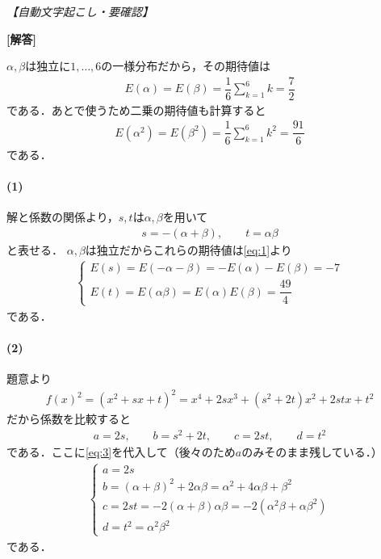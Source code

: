 \documentclass[../../main.tex]{subfiles}
\begin{document}
\begin{oframed}
  
\end{oframed}

\begin{flushright}
  \footnotesize\textit{【自動文字起こし・要確認】}
\end{flushright}

{\bf [解答]}

$\alpha, \beta$は独立に$1,\dots,6$の一様分布だから，その期待値は
\begin{align}
  E(\alpha) = E(\beta) = \dfrac{1}{6}\sum_{k=1}^{6}k = \dfrac{7}{2} \label{eq:1}
\end{align}
である．あとで使うため二乗の期待値も計算すると
\begin{align}
  E(\alpha^2)=E(\beta^2)=\dfrac{1}{6}\displaystyle\sum_{k=1}^6k^2=\dfrac{91}{6} \label{eq:2}
\end{align}
である．

\paragraph{(1)}

解と係数の関係より，$s,t$は$\alpha,\beta$を用いて
\begin{align}
  s=-(\alpha+\beta),\qquad t=\alpha\beta \label{eq:3}
\end{align}
と表せる．
$\alpha,\beta$は独立だからこれらの期待値は\cref{eq:1}より
\begin{align}
  \begin{cases}
    E(s)=E(-\alpha-\beta) = -E(\alpha)-E(\beta)=-7 \\
    E(t)=E(\alpha\beta)   = E(\alpha)E(\beta) =\dfrac{49}{4}
  \end{cases} \label{eq:4}
\end{align}
である．

\paragraph{(2)}

題意より
\begin{align}
  f(x)^2=(x^2+sx+t)^2=x^4+2sx^3+(s^2+2t)x^2+2stx+t^2
\end{align}
だから係数を比較すると
\begin{align}
  a=2s,\qquad b=s^2+2t,\qquad c=2st,\qquad d=t^2
\end{align}
である．ここに\cref{eq:3}を代入して（後々のため$a$のみそのまま残している．）
\begin{align}
  \begin{cases}
    a = 2s \\
    b = (\alpha+\beta)^2+2\alpha\beta=\alpha^2+4\alpha\beta+\beta^2 \\
    c = 2st=-2(\alpha+\beta)\alpha\beta=-2(\alpha^2\beta+\alpha\beta^2) \\
    d = t^2=\alpha^2\beta^2
  \end{cases} \label{eq:5}
\end{align}
である．
\end{document}
